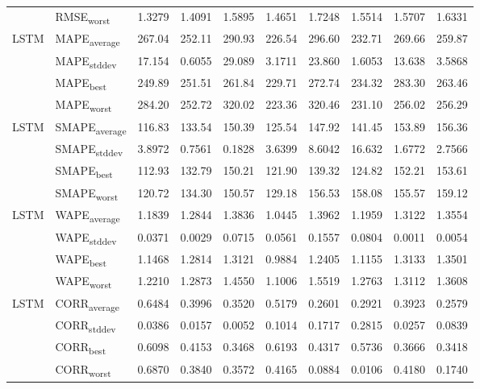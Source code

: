 {\begin{longtable}{l l c c c c c c c c}
 & RMSE\textsubscript{worst} & 1.3279 & 1.4091 & 1.5895 & 1.4651 & 1.7248 & 1.5514 & 1.5707 & 1.6331 \\
\cmidrule(lr){2-10}
\multirow{4}{*}{LSTM} & MAPE\textsubscript{average} & 267.04 & 252.11 & 290.93 & 226.54 & 296.60 & 232.71 & 269.66 & 259.87 \\
 & MAPE\textsubscript{stddev} & 17.154 & 0.6055 & 29.089 & 3.1711 & 23.860 & 1.6053 & 13.638 & 3.5868 \\
 & MAPE\textsubscript{best} & 249.89 & 251.51 & 261.84 & 229.71 & 272.74 & 234.32 & 283.30 & 263.46 \\
 & MAPE\textsubscript{worst} & 284.20 & 252.72 & 320.02 & 223.36 & 320.46 & 231.10 & 256.02 & 256.29 \\
\cmidrule(lr){2-10}
\multirow{4}{*}{LSTM} & SMAPE\textsubscript{average} & 116.83 & 133.54 & 150.39 & 125.54 & 147.92 & 141.45 & 153.89 & 156.36 \\
 & SMAPE\textsubscript{stddev} & 3.8972 & 0.7561 & 0.1828 & 3.6399 & 8.6042 & 16.632 & 1.6772 & 2.7566 \\
 & SMAPE\textsubscript{best} & 112.93 & 132.79 & 150.21 & 121.90 & 139.32 & 124.82 & 152.21 & 153.61 \\
 & SMAPE\textsubscript{worst} & 120.72 & 134.30 & 150.57 & 129.18 & 156.53 & 158.08 & 155.57 & 159.12 \\
\cmidrule(lr){2-10}
\multirow{4}{*}{LSTM} & WAPE\textsubscript{average} & 1.1839 & 1.2844 & 1.3836 & 1.0445 & 1.3962 & 1.1959 & 1.3122 & 1.3554 \\
 & WAPE\textsubscript{stddev} & 0.0371 & 0.0029 & 0.0715 & 0.0561 & 0.1557 & 0.0804 & 0.0011 & 0.0054 \\
 & WAPE\textsubscript{best} & 1.1468 & 1.2814 & 1.3121 & 0.9884 & 1.2405 & 1.1155 & 1.3133 & 1.3501 \\
 & WAPE\textsubscript{worst} & 1.2210 & 1.2873 & 1.4550 & 1.1006 & 1.5519 & 1.2763 & 1.3112 & 1.3608 \\
\cmidrule(lr){2-10}
\multirow{4}{*}{LSTM} & CORR\textsubscript{average} & 0.6484 & 0.3996 & 0.3520 & 0.5179 & 0.2601 & 0.2921 & 0.3923 & 0.2579 \\
 & CORR\textsubscript{stddev} & 0.0386 & 0.0157 & 0.0052 & 0.1014 & 0.1717 & 0.2815 & 0.0257 & 0.0839 \\
 & CORR\textsubscript{best} & 0.6098 & 0.4153 & 0.3468 & 0.6193 & 0.4317 & 0.5736 & 0.3666 & 0.3418 \\
 & CORR\textsubscript{worst} & 0.6870 & 0.3840 & 0.3572 & 0.4165 & 0.0884 & 0.0106 & 0.4180 & 0.1740 \\

\end{longtable}}
